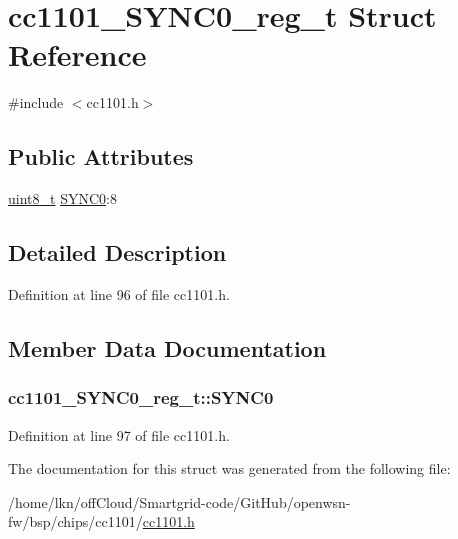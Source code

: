 \hypertarget{structcc1101___s_y_n_c0__reg__t}{}\section{cc1101\+\_\+\+S\+Y\+N\+C0\+\_\+reg\+\_\+t Struct Reference}
\label{structcc1101___s_y_n_c0__reg__t}


{\ttfamily \#include $<$cc1101.\+h$>$}

\subsection*{Public Attributes}
\begin{DoxyCompactItemize}
\item 
\hyperlink{_p_e___types_8h_aba7bc1797add20fe3efdf37ced1182c5}{uint8\+\_\+t} \hyperlink{structcc1101___s_y_n_c0__reg__t_adbefcfe65807d827c9744b91605b3fd8}{S\+Y\+N\+C0}\+:8
\end{DoxyCompactItemize}


\subsection{Detailed Description}


Definition at line 96 of file cc1101.\+h.



\subsection{Member Data Documentation}
\subsubsection[{\texorpdfstring{S\+Y\+N\+C0}{SYNC0}}]{ cc1101\+\_\+\+S\+Y\+N\+C0\+\_\+reg\+\_\+t\+::\+S\+Y\+N\+C0}\hypertarget{structcc1101___s_y_n_c0__reg__t_adbefcfe65807d827c9744b91605b3fd8}{}\label{structcc1101___s_y_n_c0__reg__t_adbefcfe65807d827c9744b91605b3fd8}


Definition at line 97 of file cc1101.\+h.



The documentation for this struct was generated from the following file\+:\begin{DoxyCompactItemize}
\item 
/home/lkn/off\+Cloud/\+Smartgrid-\/code/\+Git\+Hub/openwsn-\/fw/bsp/chips/cc1101/\hyperlink{cc1101_8h}{cc1101.\+h}\end{DoxyCompactItemize}
